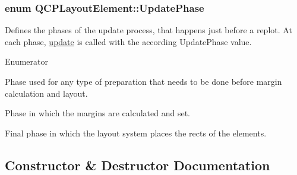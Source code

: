 \subsubsection[{\texorpdfstring{Update\+Phase}{UpdatePhase}}]{\setlength{\rightskip}{0pt plus 5cm}enum {\bf Q\+C\+P\+Layout\+Element\+::\+Update\+Phase}}\hypertarget{classQCPLayoutElement_a0d83360e05735735aaf6d7983c56374d}{}\label{classQCPLayoutElement_a0d83360e05735735aaf6d7983c56374d}
Defines the phases of the update process, that happens just before a replot. At each phase, \hyperlink{classQCPLayoutElement_a929c2ec62e0e0e1d8418eaa802e2af9b}{update} is called with the according Update\+Phase value. \begin{Desc}
\item[Enumerator]\par
\begin{description}
\item[{\em 
up\+Preparation\hypertarget{classQCPLayoutElement_a0d83360e05735735aaf6d7983c56374dad6119882eba136357c2f627992e527d3}{}\label{classQCPLayoutElement_a0d83360e05735735aaf6d7983c56374dad6119882eba136357c2f627992e527d3}
}]Phase used for any type of preparation that needs to be done before margin calculation and layout. \item[{\em 
up\+Margins\hypertarget{classQCPLayoutElement_a0d83360e05735735aaf6d7983c56374da288cb59a92280e47261a341f2813e676}{}\label{classQCPLayoutElement_a0d83360e05735735aaf6d7983c56374da288cb59a92280e47261a341f2813e676}
}]Phase in which the margins are calculated and set. \item[{\em 
up\+Layout\hypertarget{classQCPLayoutElement_a0d83360e05735735aaf6d7983c56374da5d1ccf5d79967c232c3c511796860045}{}\label{classQCPLayoutElement_a0d83360e05735735aaf6d7983c56374da5d1ccf5d79967c232c3c511796860045}
}]Final phase in which the layout system places the rects of the elements. \end{description}
\end{Desc}


\subsection{Constructor \& Destructor Documentation}
